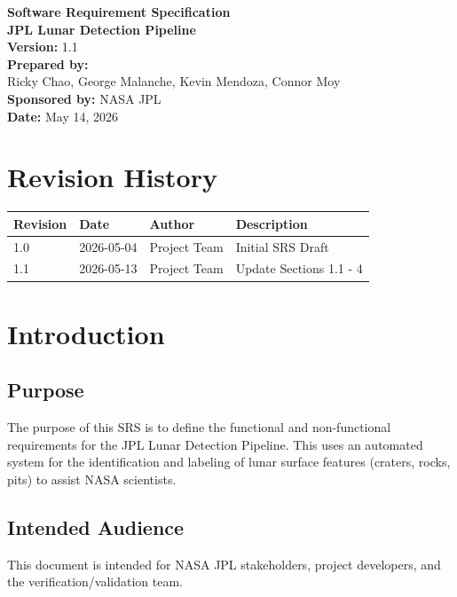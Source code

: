 \documentclass[12pt]{article}
\begin{document}
\begin{titlepage}
    \centering
    \vspace*{2cm}
    {\Huge \textbf{Software Requirement Specification}} \\
    \vspace{0.5cm}
    {\Large \textbf{JPL Lunar Detection Pipeline}} \\
    \vfill
    \textbf{Version:} 1.1 \\
    \textbf{Prepared by:} \\
     Ricky Chao, George Malanche, Kevin Mendoza, Connor Moy \\
    \vspace{1cm}
    \textbf{Sponsored by:} NASA JPL \\
    \textbf{Date:} May 14, 2026
\end{titlepage}

\newpage
\tableofcontents
\newpage

\section*{Revision History}
\begin{tabularx}{\textwidth}{|l|l|l|X|}
\hline
\textbf{Revision} & \textbf{Date} & \textbf{Author} & \textbf{Description} \\ \hline
1.0 & 2026-05-04 & Project Team & Initial SRS Draft \\ \hline
1.1 & 2026-05-13 & Project Team & Update Sections 1.1 - 4 \\ \hline
\end{tabularx}


\section{Introduction}
\subsection{Purpose}
The purpose of this SRS is to define the functional and non-functional requirements for the JPL Lunar Detection Pipeline. This uses an automated system for the identification and labeling of lunar surface features (craters, rocks, pits) to assist NASA scientists.

\subsection{Intended Audience}
This document is intended for NASA JPL stakeholders, project developers, and the verification/validation team.
\end{document}
